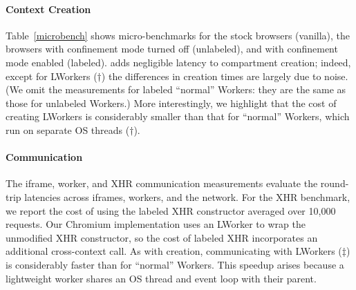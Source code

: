 \paragraph{Context Creation}
Table~\ref{microbench} shows micro-benchmarks for the stock
browsers (vanilla), the \sys{} browsers with confinement mode turned
off (unlabeled), and with confinement mode enabled (labeled).
%
\sys{} adds negligible latency to compartment creation; indeed, except
for LWorkers ($\dagger$) the differences in creation times are largely
due to noise.
%
(We omit the measurements for labeled ``normal'' Workers: they
are the same as those for unlabeled Workers.)
%
More interestingly, we highlight that the cost of creating LWorkers is
considerably smaller than that for ``normal'' Workers, which run on
separate OS threads ($\dagger$).

\paragraph{Communication} The iframe, worker, and XHR communication measurements evaluate the
round-trip latencies across iframes, workers, and the network.
%
For the XHR benchmark, we report the cost of using the labeled XHR
constructor averaged over 10,000 requests.
%
Our Chromium implementation uses an  LWorker to wrap the unmodified
XHR constructor, so the cost of labeled XHR incorporates an additional
cross-context call.
%
As with creation, communicating with LWorkers ($\ddagger$)
is considerably faster than for ``normal'' Workers.
%
This speedup arises because a lightweight worker shares
 an OS thread and event loop with their parent.
%


